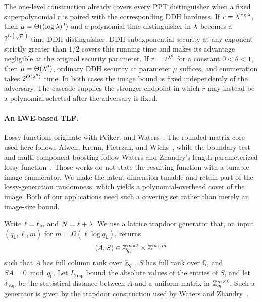 The one-level construction already covers every PPT distinguisher when a
fixed superpolynomial $r$ is paired with the corresponding DDH hardness. If
$r=\lambda^{\log\lambda}$, then $\mu=\Theta((\log\lambda)^2)$ and a
polynomial-time distinguisher in $\lambda$ becomes a
$2^{O(\sqrt{\mu})}$-time DDH distinguisher. DDH subexponential security at
any exponent strictly greater than $1/2$ covers this running time and makes
its advantage negligible at the original security parameter. If
$r=2^{\lambda^\theta}$ for a constant $0<\theta<1$, then
$\mu=\Theta(\lambda^\theta)$, ordinary DDH security at parameter $\mu$ suffices,
and enumeration takes $2^{O(\lambda^\theta)}$ time. In both cases the image bound
is fixed independently of the adversary. The cascade supplies the stronger
endpoint in which $r$ may instead be a polynomial selected after the
adversary is fixed.

\paragraph*{An LWE-based TLF.}
Lossy functions originate with Peikert and
Waters~\cite{STOC:PeiWat08,JACM:PeiWat11}. The rounded-matrix core used here
follows Alwen, Krenn, Pietrzak, and Wichs~\cite{C:AKPW13}, while the boundary
test and multi-component boosting follow Waters and Zhandry's
length-parameterized lossy function~\cite{C:WatZha24}. Those works do not
state the resulting function with a tunable image enumerator. We make the
latent dimension tunable and retain part of the lossy-generation randomness,
which yields a polynomial-overhead cover of the image. Both of our
applications need such a covering set rather than merely an image-size bound.

Write $\ell=\ell_{\mathrm{in}}$ and $N=\ell+\lambda$. We use a lattice trapdoor generator
that, on input $(q_{\mathsf L},\ell,m)$ for
$m=\Omega(\ell\log q_{\mathsf L})$, returns
$$
(A,S)\in\mathbb Z_{q_{\mathsf L}}^{m\times\ell}\times\mathbb Z^{m\times m}
$$
such that $A$ has full column rank over $\mathbb Z_{q_{\mathsf L}}$, $S$ has full
rank over $\mathbb{Q}$, and $SA=0\bmod q_{\mathsf L}$. Let
$L_{\mathsf{trap}}$ bound the absolute values of the entries of $S$, and let
$\delta_{\mathsf{trap}}$ be the
statistical distance between $A$ and a uniform matrix in
$\mathbb Z_{q_{\mathsf L}}^{m\times\ell}$. Such a generator is given by the trapdoor
construction
used by Waters and Zhandry~\cite{C:WatZha24}.

